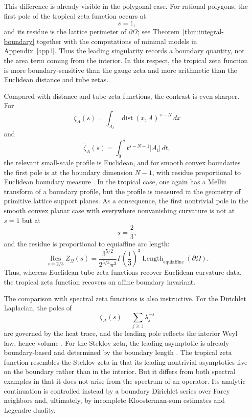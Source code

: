 \documentclass[a4paper,american,11pt]{amsart}
\theoremstyle{plain}
\theoremstyle{definition}
\begin{document}
This difference is already visible in the polygonal case. For rational polygons, the first pole of the tropical zeta function occurs at
\[
s=1,
\]
and its residue is the lattice perimeter of \(\partial\Omega\); see Theorem~\ref{thm:integral-boundary} together with the computations of minimal models in Appendix~\ref{app1}. Thus the leading singularity records a boundary quantity, not the area term coming from the interior. In this respect, the tropical zeta function is more boundary-sensitive than the gauge zeta and more arithmetic than the Euclidean distance and tube zetas.

Compared with distance and tube zeta functions, the contrast is even sharper. For
\[
\zeta_A(s)=\int_{A_\delta}\operatorname{dist}(x,A)^{\,s-N}\,dx
\]
and
\[
\widetilde\zeta_A(s)=\int_0^\delta t^{s-N-1}|A_t|\,dt,
\]
the relevant small-scale profile is Euclidean, and for smooth convex boundaries the first pole is at the boundary dimension \(N-1\), with residue proportional to Euclidean boundary measure \cite{LapidusRadunovicZubrinic2017JMAA,LapidusRadunovicZubrinic2017,Federer1959}. In the tropical case, one again has a Mellin transform of a boundary profile, but the profile is measured in the geometry of primitive lattice support planes. As a consequence, the first nontrivial pole in the smooth convex planar case with everywhere nonvanishing curvature is not at \(s=1\) but at
\[
s=\frac23,
\]
and the residue is proportional to equiaffine arc length:
\[
\operatorname*{Res}_{s=2/3}Z_\Omega(s)
=
\frac{3^{5/2}}{2^{5/3}\pi^3}\Gamma\!\left(\frac13\right)^3
\operatorname{Length}_{\mathrm{equiaffine}}(\partial\Omega).
\]
Thus, whereas Euclidean tube zeta functions recover Euclidean curvature data, the tropical zeta function recovers an affine boundary invariant.

The comparison with spectral zeta functions is also instructive. For the Dirichlet Laplacian, the poles of
\[
\zeta_\Delta(s)=\sum_{j\ge1}\lambda_j^{-s}
\]
are governed by the heat trace, and the leading pole reflects the interior Weyl law, hence volume \cite{MinakshisundaramPleijel1949,Seeley1967}. For the Steklov zeta, the leading asymptotic is already boundary-based and determined by the boundary length \cite{GirouardParnovskiPolterovichSher2014,JollivetSharafutdinov2018}. The tropical zeta function resembles the Steklov zeta in that its leading nontrivial asymptotics live on the boundary rather than in the interior. But it differs from both spectral examples in that it does not arise from the spectrum of an operator. Its analytic continuation is controlled instead by a boundary Dirichlet series over Farey neighbors and, ultimately, by incomplete Kloosterman-sum estimates and Legendre duality.
\end{document}
